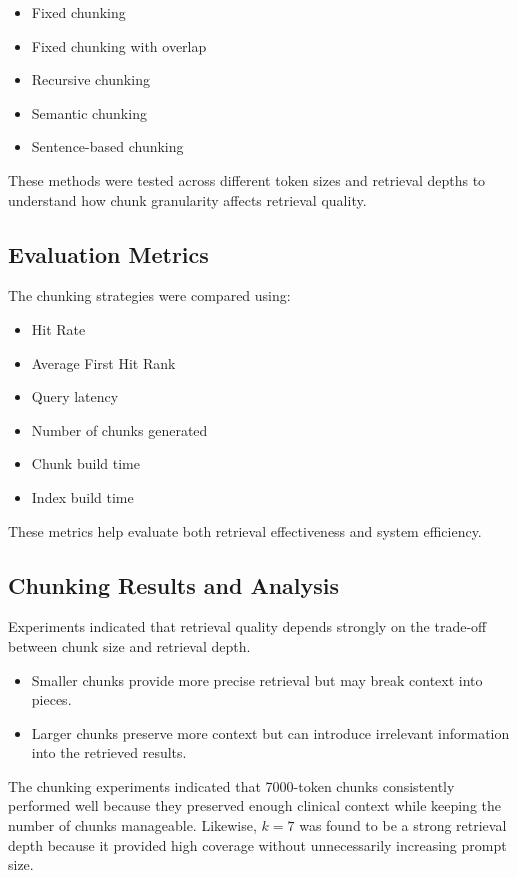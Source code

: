 \documentclass[12pt]{article}
\begin{document}
\begin{itemize}[leftmargin=1.5em]
    \item Fixed chunking
    \item Fixed chunking with overlap
    \item Recursive chunking
    \item Semantic chunking
    \item Sentence-based chunking
\end{itemize}

These methods were tested across different token sizes and retrieval depths to understand how chunk granularity affects retrieval quality.

\subsection{Evaluation Metrics}

The chunking strategies were compared using:

\begin{itemize}[leftmargin=1.5em]
    \item Hit Rate
    \item Average First Hit Rank
    \item Query latency
    \item Number of chunks generated
    \item Chunk build time
    \item Index build time
\end{itemize}

These metrics help evaluate both retrieval effectiveness and system efficiency.

\subsection{Chunking Results and Analysis}

Experiments indicated that retrieval quality depends strongly on the trade-off between chunk size and retrieval depth.

\begin{itemize}[leftmargin=1.5em]
    \item Smaller chunks provide more precise retrieval but may break context into pieces.
    \item Larger chunks preserve more context but can introduce irrelevant information into the retrieved results.
\end{itemize}

The chunking experiments indicated that 7000-token chunks consistently performed well because they preserved enough clinical context while keeping the number of chunks manageable. Likewise, $k = 7$ was found to be a strong retrieval depth because it provided high coverage without unnecessarily increasing prompt size.
\end{document}
